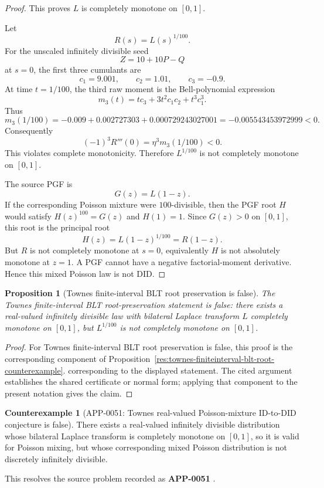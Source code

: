 \documentclass[11pt]{article}
\numberwithin{equation}{section}
\newtheorem{proposition}[theorem]{Proposition}
\theoremstyle{definition}
\newtheorem{counterexample}[theorem]{Counterexample}
\theoremstyle{remark}
\newcommand{\1}{\mathbf 1}
\begin{document}
\begin{proof}
This proves \(L\) is completely monotone on \([0,1]\).

Let
\[
R(s)=L(s)^{1/100}.
\]
For the unscaled infinitely divisible seed
\[
Z=10+10P-Q
\]
at \(s=0\), the first three cumulants are
\[
c_1=9.001,\qquad c_2=1.01,\qquad c_3=-0.9.
\]
At time \(t=1/100\), the third raw moment is the Bell-polynomial expression
\[
m_3(t)=tc_3+3t^2c_1c_2+t^3c_1^3.
\]
Thus
\[
m_3(1/100)
=-0.009+0.002727303+0.000729243027001
=-0.005543453972999<0.
\]
Consequently
\[
(-1)^3R'''(0)=\eta^3m_3(1/100)<0.
\]
This violates complete monotonicity. Therefore \(L^{1/100}\) is not completely monotone on \([0,1]\).

The source PGF is
\[
G(z)=L(1-z).
\]
If the corresponding Poisson mixture were \(100\)-divisible, then the PGF root \(H\) would satisfy \(H(z)^{100}=G(z)\) and \(H(1)=1\). Since \(G(z)>0\) on \([0,1]\), this root is the principal root
\[
H(z)=L(1-z)^{1/100}=R(1-z).
\]
But \(R\) is not completely monotone at \(s=0\), equivalently \(H\) is not absolutely monotone at \(z=1\). A PGF cannot have a negative factorial-moment derivative. Hence this mixed Poisson law is not DID.
\end{proof}

\begin{proposition}[Townes finite-interval BLT root preservation is false]
\label{res:not-townes-finiteinterval-blt-root-preservation}
The Townes finite-interval BLT root-preservation statement is false: there exists a real-valued infinitely divisible law with bilateral Laplace transform \(L\) completely monotone on \([0,1]\), but \(L^{1/100}\) is not completely monotone on \([0,1]\).
\end{proposition}

\begin{proof}
For Townes finite-interval BLT root preservation is false, this proof is the corresponding component of Proposition~\ref{res:townes-finiteinterval-blt-root-counterexample}.  corresponding to the displayed statement.  The cited argument establishes the shared certificate or normal form; applying that component to the present notation gives the claim.
\end{proof}

\begin{counterexample}[APP-0051: Townes real-valued Poisson-mixture ID-to-DID conjecture is false]
\label{res:not-townes-poissonmixture-id-implies-did-conjecture}
There exists a real-valued infinitely divisible distribution whose bilateral Laplace transform is completely monotone on \([0,1]\), so it is valid for Poisson mixing, but whose corresponding mixed Poisson distribution is not discretely infinitely divisible.



This resolves the source problem recorded as \textbf{APP-0051} \cite{app-app-0051-source}.
\end{counterexample}
\end{document}
